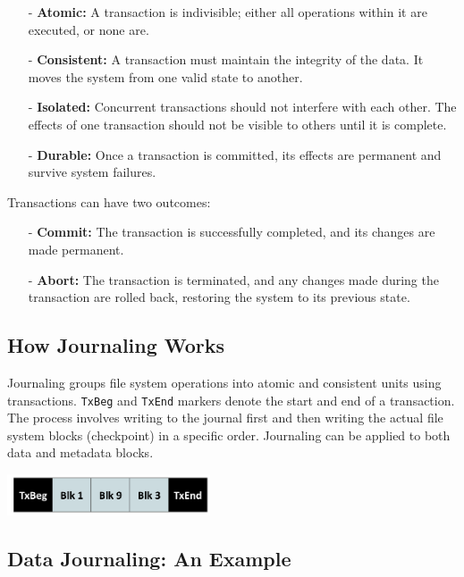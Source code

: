 \documentclass[../../compsys.tex]{subfiles}
\begin{document}
\begin{itemize}
    \item [-] \textbf{Atomic:} A transaction is indivisible; either all operations within it are executed, or none are.
    \item [-] \textbf{Consistent:} A transaction must maintain the integrity of the data. It moves the system from one valid state to another.
    \item [-] \textbf{Isolated:} Concurrent transactions should not interfere with each other. The effects of one transaction should not be visible to others until it is complete.
    \item [-] \textbf{Durable:} Once a transaction is committed, its effects are permanent and survive system failures.
\end{itemize}

Transactions can have two outcomes:

\begin{itemize}
    \item [-] \textbf{Commit:} The transaction is successfully completed, and its changes are made permanent.
    \item [-] \textbf{Abort:} The transaction is terminated, and any changes made during the transaction are rolled back, restoring the system to its previous state.
\end{itemize}

\subsection{How Journaling Works}

Journaling groups file system operations into atomic and consistent units using transactions. \texttt{TxBeg} and \texttt{TxEnd} markers denote the start and end of a transaction. The process involves writing to the journal first and then writing the actual file system blocks (checkpoint) in a specific order. Journaling can be applied to both data and metadata blocks.

\begin{center}
    \includegraphics[width=0.45\textwidth]{chapters/L7/images/journal-record.png}
\end{center}

\subsection{Data Journaling: An Example}
\end{document}
